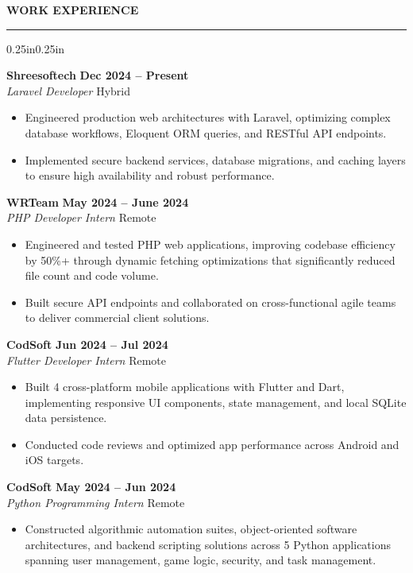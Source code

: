 \documentclass[11pt,a4paper]{article}
\newcommand{\cvsection}[1]{%
    \vspace{10pt}
    \noindent\textbf{\large\MakeUppercase{#1}}
    \vspace{3pt}
    \hrule
    \vspace{5pt}
}
\newcommand{\expheader}[4]{%
    \noindent\textbf{#1} \hfill \textbf{#2} \\
    \textit{#3} \hfill #4
}
\begin{document}
\cvsection{Work Experience}
\begin{adjustwidth}{0.25in}{0.25in}

\expheader{Shreesoftech}{Dec 2024 -- Present}{Laravel Developer}{Hybrid}
\vspace{2pt}
\begin{itemize}[leftmargin=0.2in, itemsep=1pt, parsep=0pt, topsep=0pt]
\item Engineered production web architectures with Laravel, optimizing complex database workflows, Eloquent ORM queries, and RESTful API endpoints.
\item Implemented secure backend services, database migrations, and caching layers to ensure high availability and robust performance.
\end{itemize}

\vspace{8pt}

\expheader{WRTeam}{May 2024 -- June 2024}{PHP Developer Intern}{Remote}
\vspace{2pt}
\begin{itemize}[leftmargin=0.2in, itemsep=1pt, parsep=0pt, topsep=0pt]
\item Engineered and tested PHP web applications, improving codebase efficiency by 50\%+ through dynamic fetching optimizations that significantly reduced file count and code volume.
\item Built secure API endpoints and collaborated on cross-functional agile teams to deliver commercial client solutions.
\end{itemize}

\vspace{8pt}

\expheader{CodSoft}{Jun 2024 -- Jul 2024}{Flutter Developer Intern}{Remote}
\vspace{2pt}
\begin{itemize}[leftmargin=0.2in, itemsep=1pt, parsep=0pt, topsep=0pt]
\item Built 4 cross-platform mobile applications with Flutter and Dart, implementing responsive UI components, state management, and local SQLite data persistence.
\item Conducted code reviews and optimized app performance across Android and iOS targets.
\end{itemize}

\vspace{8pt}

\expheader{CodSoft}{May 2024 -- Jun 2024}{Python Programming Intern}{Remote}
\vspace{2pt}
\begin{itemize}[leftmargin=0.2in, itemsep=1pt, parsep=0pt, topsep=0pt]
\item Constructed algorithmic automation suites, object-oriented software architectures, and backend scripting solutions across 5 Python applications spanning user management, game logic, security, and task management.
\end{itemize}


\end{adjustwidth}
\end{document}
